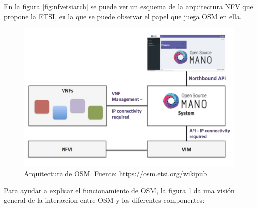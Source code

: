 En la figura \ref{fig:nfvetsiarch} se puede ver un esquema de la arquitectura NFV que propone la ETSI, en la que se puede observar el papel que juega OSM en ella. 

\clearpage

\begin{figure}[!ht]
	\centering
	\includegraphics[width=0.8\linewidth]{imagenes/osm_arch}
	\caption{Arquitectura de OSM. 
		Fuente: https://osm.etsi.org/wikipub}
	\label{fig:osmarch}
\end{figure}

Para ayudar a explicar el funcionamiento de OSM, la figura \ref{fig:osmarch} da una visión general de la interaccion entre OSM y los diferentes componentes:

